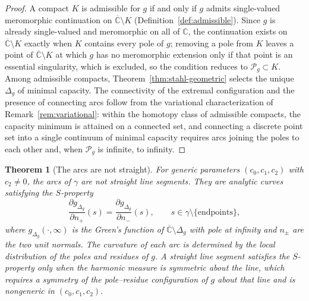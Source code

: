 \documentclass[11pt]{article}
\newtheorem{theorem}{Theorem}[section]
\theoremstyle{definition}
\theoremstyle{remark}
\begin{document}
\begin{proof}
A compact $K$ is admissible for $g$ if and only if $g$ admits single-valued meromorphic continuation on $\overline{\mathbb{C}}\setminus K$ (Definition~\ref{def:admissible}). Since $g$ is already single-valued and meromorphic on all of $\mathbb{C}$, the continuation exists on $\overline{\mathbb{C}}\setminus K$ exactly when $K$ contains every pole of $g$; removing a pole from $K$ leaves a point of $\overline{\mathbb{C}}\setminus K$ at which $g$ has no meromorphic extension only if that point is an essential singularity, which is excluded, so the condition reduces to $\mathcal{P}_{g}\subset K$. Among admissible compacts, Theorem~\ref{thm:stahl-geometric} selects the unique $\Delta_{g}$ of minimal capacity. The connectivity of the extremal configuration and the presence of connecting arcs follow from the variational characterization of Remark~\ref{rem:variational}: within the homotopy class of admissible compacts, the capacity minimum is attained on a connected set, and connecting a discrete point set into a single continuum of minimal capacity requires arcs joining the poles to each other and, when $\mathcal{P}_{g}$ is infinite, to infinity.
\end{proof}

\begin{theorem}[The arcs are not straight]
\label{thm:arcs-not-straight}
For generic parameters $(c_{0},c_{1},c_{2})$ with $c_{2}\ne 0$, the arcs of $\gamma$ are not straight line segments. They are analytic curves satisfying the $S$-property
\begin{equation}
\frac{\partial g_{\Delta_{g}}}{\partial n_{+}}(s)=\frac{\partial g_{\Delta_{g}}}{\partial n_{-}}(s),
\qquad s\in\gamma\setminus\{\text{endpoints}\},
\label{eq:s-property-arcs}
\end{equation}
where $g_{\Delta_{g}}(\cdot,\infty)$ is the Green's function of $\overline{\mathbb{C}}\setminus\Delta_{g}$ with pole at infinity and $n_{\pm}$ are the two unit normals. The curvature of each arc is determined by the local distribution of the poles and residues of $g$. A straight line segment satisfies the $S$-property only when the harmonic measure is symmetric about the line, which requires a symmetry of the pole--residue configuration of $g$ about that line and is nongeneric in $(c_{0},c_{1},c_{2})$.
\end{theorem}
\end{document}
